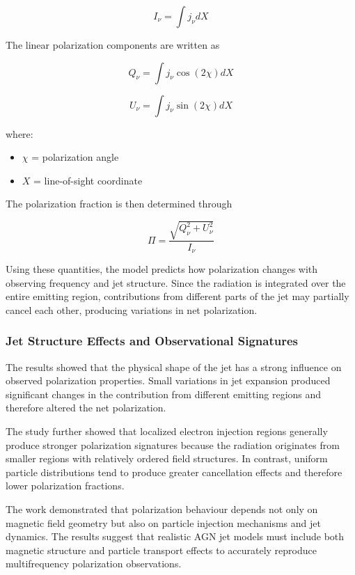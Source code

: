 \documentclass{article}
\begin{document}
\begin{equation}
I_\nu
=
\int j_\nu dX
\end{equation}

The linear polarization components are written as

\begin{equation}
Q_\nu
=
\int j_\nu \cos(2\chi)dX
\end{equation}

\begin{equation}
U_\nu
=
\int j_\nu \sin(2\chi)dX
\end{equation}

where:

\begin{itemize}
\item $\chi$ = polarization angle
\item $X$ = line-of-sight coordinate
\end{itemize}

The polarization fraction is then determined through

\begin{equation}
\Pi
=
\frac{\sqrt{Q_\nu^2+U_\nu^2}}
{I_\nu}
\end{equation}

Using these quantities, the model predicts how polarization changes with observing frequency and jet structure. Since the radiation is integrated over the entire emitting region, contributions from different parts of the jet may partially cancel each other, producing variations in net polarization.


\subsubsection{Jet Structure Effects and Observational Signatures}

The results showed that the physical shape of the jet has a strong influence on observed polarization properties. Small variations in jet expansion produced significant changes in the contribution from different emitting regions and therefore altered the net polarization.

The study further showed that localized electron injection regions generally produce stronger polarization signatures because the radiation originates from smaller regions with relatively ordered field structures. In contrast, uniform particle distributions tend to produce greater cancellation effects and therefore lower polarization fractions.

The work demonstrated that polarization behaviour depends not only on magnetic field geometry but also on particle injection mechanisms and jet dynamics. The results suggest that realistic AGN jet models must include both magnetic structure and particle transport effects to accurately reproduce multifrequency polarization observations.
\end{document}

